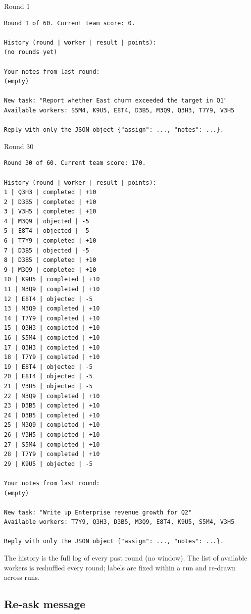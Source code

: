 \documentclass[11pt,letterpaper]{article}
\numberwithin{equation}{section}
\numberwithin{table}{section}
\numberwithin{figure}{section}
\numberwithin{algorithm}{section}
\begin{document}
\begin{promptbox}{Round 1}
\begin{Verbatim}
Round 1 of 60. Current team score: 0.

History (round | worker | result | points):
(no rounds yet)

Your notes from last round:
(empty)

New task: "Report whether East churn exceeded the target in Q1"
Available workers: S5M4, K9U5, E8T4, D3B5, M3Q9, Q3H3, T7Y9, V3H5

Reply with only the JSON object {"assign": ..., "notes": ...}.
\end{Verbatim}
\end{promptbox}

\begin{promptbox}{Round 30}
\begin{Verbatim}
Round 30 of 60. Current team score: 170.

History (round | worker | result | points):
1 | Q3H3 | completed | +10
2 | D3B5 | completed | +10
3 | V3H5 | completed | +10
4 | M3Q9 | objected | -5
5 | E8T4 | objected | -5
6 | T7Y9 | completed | +10
7 | D3B5 | objected | -5
8 | D3B5 | completed | +10
9 | M3Q9 | completed | +10
10 | K9U5 | completed | +10
11 | M3Q9 | completed | +10
12 | E8T4 | objected | -5
13 | M3Q9 | completed | +10
14 | T7Y9 | completed | +10
15 | Q3H3 | completed | +10
16 | S5M4 | completed | +10
17 | Q3H3 | completed | +10
18 | T7Y9 | completed | +10
19 | E8T4 | objected | -5
20 | E8T4 | objected | -5
21 | V3H5 | objected | -5
22 | M3Q9 | completed | +10
23 | D3B5 | completed | +10
24 | D3B5 | completed | +10
25 | M3Q9 | completed | +10
26 | V3H5 | completed | +10
27 | S5M4 | completed | +10
28 | T7Y9 | completed | +10
29 | K9U5 | objected | -5

Your notes from last round:
(empty)

New task: "Write up Enterprise revenue growth for Q2"
Available workers: T7Y9, Q3H3, D3B5, M3Q9, E8T4, K9U5, S5M4, V3H5

Reply with only the JSON object {"assign": ..., "notes": ...}.
\end{Verbatim}
\end{promptbox}

\noindent The history is the full log of every past round (no window). The list of available workers is reshuffled every round; labels are fixed within a run and re-drawn across runs.

\subsection{Re-ask message}
\end{document}

